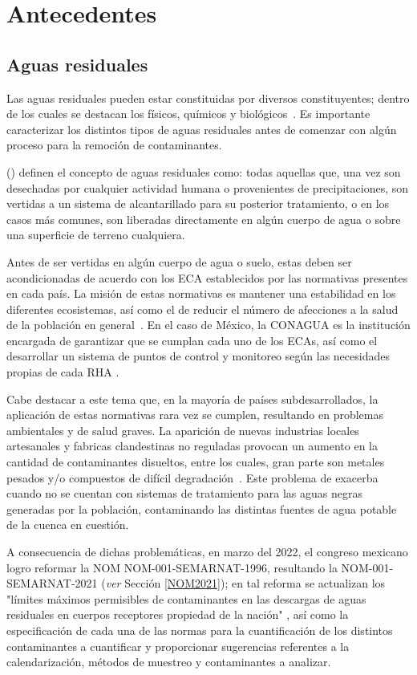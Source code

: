 \section{Antecedentes}
\subsection{Aguas residuales}
Las aguas residuales pueden estar constituidas por diversos constituyentes; dentro de los cuales se destacan los físicos, químicos y biológicos~\citep{crites2000}. Es importante caracterizar los distintos tipos de aguas residuales antes de comenzar con algún proceso para la remoción de contaminantes.\par
\citeauthor{metcalf2003} (\citeyear{metcalf2003}) definen el concepto de aguas residuales como: todas aquellas que, una vez son desechadas por cualquier actividad humana o provenientes de precipitaciones, son vertidas a un sistema de alcantarillado para su posterior tratamiento, o en los casos más comunes, son liberadas directamente en algún cuerpo de agua o sobre una superficie de terreno cualquiera.\par
Antes de ser vertidas en algún cuerpo de agua o suelo, estas deben ser acondicionadas de acuerdo con los \gls{ECA} establecidos por las normativas presentes en cada país. La misión de estas normativas es mantener una estabilidad en los diferentes ecosistemas, así como el de reducir el número de afecciones a la salud de la población en general~\citep{lazcano2016,martinez1999}. En el caso de México, la \gls{CONAGUA} es la institución encargada de garantizar que se cumplan cada uno de los \acrshort{ECA}s, así como el desarrollar un sistema de puntos de control y monitoreo según las necesidades propias de cada \gls{RHA} \citep{Ortiz2013}. \par
Cabe destacar a este tema que, en la mayoría de países subdesarrollados, la aplicación de estas normativas rara vez se cumplen, resultando en problemas ambientales y de salud graves. La aparición de nuevas industrias locales artesanales y fabricas clandestinas no reguladas provocan un aumento en la cantidad de contaminantes disueltos, entre los cuales, gran parte son metales pesados y/o compuestos de difícil degradación~\cite{metcalf2003}.
Este problema de exacerba cuando no se cuentan con sistemas de tratamiento para las aguas negras generadas por la población, contaminando las distintas fuentes de agua potable de la cuenca en cuestión.\par
A consecuencia de dichas problemáticas, en marzo del 2022, el congreso mexicano logro reformar la \gls{NOM} NOM-001-SEMARNAT-1996, resultando la NOM-001-SEMARNAT-2021 (\emph{ver} Sección \ref{NOM2021}); en tal reforma se actualizan los "límites máximos permisibles de contaminantes en las descargas de aguas residuales en cuerpos receptores propiedad de la nación" \citep{NOM2021}, así como la especificación de cada una de las normas para la cuantificación de los distintos contaminantes a cuantificar y proporcionar sugerencias referentes a la calendarización, métodos de muestreo y contaminantes a analizar.\par
